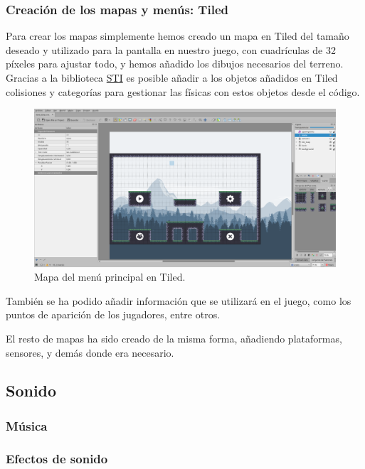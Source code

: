 \documentclass[12pt, spanish]{article}
\begin{document}
\subsubsection{Creación de los mapas y menús: Tiled}

Para crear los mapas simplemente hemos creado un mapa en Tiled del tamaño deseado y utilizado para la pantalla en nuestro juego, con cuadrículas de 32 píxeles para ajustar todo, y hemos añadido los dibujos necesarios del terreno. Gracias a la biblioteca \href{https://github.com/karai17/Simple-Tiled-Implementation}{STI} es posible añadir a los objetos añadidos en Tiled colisiones y categorías para gestionar las físicas con estos objetos desde el código.

\begin{figure}[H]
	\centering
	\includegraphics[width=\textwidth]{"mapa_menu_principal.png"}
	\caption{Mapa del menú principal en Tiled.}\label{figure:mapa_menu_principal}
\end{figure}

También se ha podido añadir información que se utilizará en el juego, como los puntos de aparición de los jugadores, entre otros.

El resto de mapas ha sido creado de la misma forma, añadiendo plataformas, sensores, y demás donde era necesario.


\subsection{Sonido}

\subsubsection{Música}

\subsubsection{Efectos de sonido}
\end{document}
